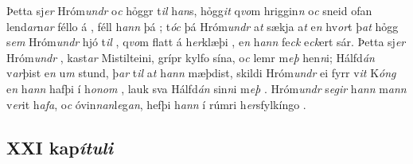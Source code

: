 Þetta sj\textit{er} Hróm\textit{undr} o\textit{c}  hỏggr t\textit{il} h\textit{an}s,  hỏgg\textit{it} q\textit{vo}m    hriggin\textit{n} o\textit{c} sneid ofan
lend\textit{ar}n\textit{ar} 
féllo á  , 
féll  h\textit{ann} þá  ; 
t\textit{óc} þá Hróm\textit{undr} a\textit{t} sækja  
 a\textit{t}  e\textit{n} hv\textit{or}t þ\textit{at} hỏgg s\textit{em} Hróm\textit{undr} hjó t\textit{il} ,   q\textit{vo}m flatt á h\textit{er}klæþi  , e\textit{n} h\textit{ann} fe\textit{ck} e\textit{ck}ert sár. Þetta  sj\textit{er} Hróm\textit{undr} , kast\textit{ar}  Mistilteini,   grípr   kylfo sína, o\textit{c} lemr m\textit{eþ} hen\textit{n}i; 
Hálfd\textit{án} v\textit{ar}þist   e\textit{n} u\textit{m} stund, þ\textit{ar} t\textit{il} a\textit{t}
h\textit{ann} mæþdist, skildi Hróm\textit{undr} ei fyrr v\textit{it}
K\textit{óng} e\textit{n} h\textit{ann} hafþi   í h\textit{onom}  , lauk sva Hálfd\textit{án}  sin\textit{n}i m\textit{eþ} . Hróm\textit{undr} s\textit{egir} h\textit{ann}   m\textit{ann} v\textit{er}it h\textit{afa}, o\textit{c}
óvin\textit{n}\textit{an}l\textit{e}g\textit{an}, hefþi h\textit{ann} í
rúmri h\textit{er}s\-fyl\-kín\-go  . 
\pend \endnumbering 
\beginnumbering \pstart 
\vspace{5mm} \subsection*{XXI kap\textit{ítuli}} 

